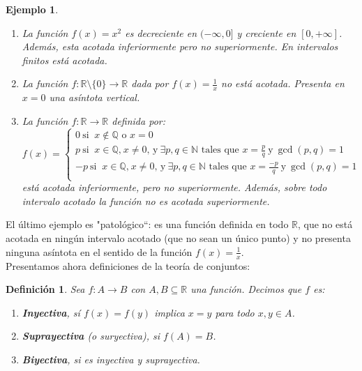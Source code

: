 \documentclass{article}
\newtheorem{define}{Definición}
\newtheorem{ejem}{Ejemplo}
\newcommand{\reales}{\mathbb{R}}
\newcommand{\naturales}{\mathbb{N}}
\newcommand{\racionales}{\mathbb{Q}}
\begin{document}
\begin{ejem}
	\begin{enumerate}
		\item
		La función $f(x) = x^2$ es decreciente en $(-\infty, 0]$ y creciente en $[0, +\infty]$. Además, esta acotada inferiormente pero no superiormente. En intervalos finitos está acotada.
		\item
		La función $f: \reales \setminus \{ 0\} \rightarrow \reales$ dada por $f(x) = \frac{1}{x}$ no está acotada. Presenta en $x = 0$ una asíntota vertical.
		\item
		La función $f: \reales \rightarrow \reales$ definida por:
		\begin{equation*}
			f(x) = \left\lbrace
			\begin{array}{l}
			0\ \text{si }\ x \not \in \racionales \text{ o } x = 0\\
			p\ \text{si }\ x \in \racionales \text{,}\ x \neq 0 \text{, y}\ \exists p,q \in \naturales \text{ tales que } x = \frac{p}{q}\  \text{y}\ \gcd(p,q) = 1\\
			-p\ \text{si }\ x \in \racionales \text{,}\ x \neq 0 \text{, y}\ \exists p,q \in \naturales \text{ tales que } x = \frac{-p}{q}\  \text{y}\ \gcd(p,q) = 1 \\
			\end{array}
			\right.
		\end{equation*}
		está acotada inferiormente, pero no superiormente. Además, sobre todo intervalo acotado la función no es acotada superiormente.
	\end{enumerate}
\end{ejem}

El último ejemplo es "patológico``: es una función definida en todo $\reales$, que no está acotada en ningún intervalo acotado (que no sean un único punto) y no presenta ninguna asíntota en el sentido de la función $f(x) = \frac{1}{x}$.\\ 
Presentamos ahora definiciones de la teoría de conjuntos:
\begin{define}
	Sea $f:A \rightarrow B$ con $A,B \subseteq \reales$ una función. Decimos que $f$ es:
	\begin{enumerate}
		\item
		\textbf{Inyectiva}, sí $f(x) = f(y)$ implica $x = y$ para todo $x,y \in A$.
		\item
		\textbf{Suprayectiva} (o suryectiva), si $f(A) = B$.
		\item
		\textbf{Biyectiva}, si es inyectiva y suprayectiva.
	\end{enumerate}
\end{define}
\end{document}
